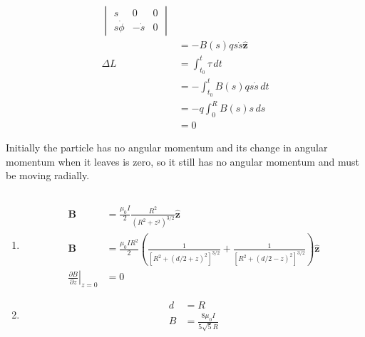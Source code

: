 \documentclass{article}
\renewcommand{\vec}[1]{\boldsymbol{\mathbf{#1}}}
\newcommand{\uvec}[1]{\hat{\vec{#1}}}
\begin{document}
\begin{align*}
\begin{vmatrix}
                            s            & 0           & 0        \\
                            s \dot{\phi} & -\dot{s}    & 0
                          \end{vmatrix}             \\
             & = -B(s) q s \dot{s} \uvec{z}                                 \\
  \Delta L   & = \int_{t_0}^t \tau \,d t                                    \\
             & = -\int_{t_0}^t B(s) q s \dot{s} \,d t                       \\
             & = -q \int_0^R B(s) s \,d s                                   \\
             & = 0
\end{align*}

Initially the particle has no angular momentum and its change in angular momentum when it leaves is zero, so it still has no angular momentum and must be moving radially.

\setcounter{subsection}{46}
\subsection{}

\begin{enumerate}
  \item

        \begin{align*}
          \vec{B}                                              & = \frac{\mu_0 I}{2} \frac{R^2}{(R^2 + z^2)^{3 / 2}} \uvec{z}                                                                    \\
          \vec{B}                                              & = \frac{\mu_0 I R^2}{2} \left( \frac{1}{[R^2 + (d / 2 + z)^2]^{3/2}} + \frac{1}{[R^2 + (d / 2 - z)^2]^{3 / 2}} \right) \uvec{z} \\
          \left. \frac{\partial B}{\partial z} \right|_{z = 0} & = 0
        \end{align*}

  \item

        \begin{align*}
          d & = R                              \\
          B & = \frac{8 \mu_0 I}{5 \sqrt{5} R}
        \end{align*}
\end{enumerate}
\end{document}
